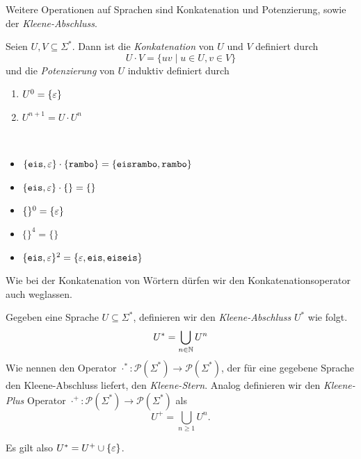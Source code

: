 Weitere Operationen auf Sprachen sind Konkatenation und Potenzierung, sowie der \emph{Kleene-Abschluss}.
\begin{Def} %
	Seien $U,V\subseteq \Sigma^*$. Dann ist die \emph{Konkatenation} von $U$ und $V$ definiert durch
	\[ U\cdot V = \{uv \mid u\in U, v\in V \} \]
  und die \emph{Potenzierung} von $U$ induktiv definiert durch
  \begin{enumerate}
  \item $U^0 = \{\varepsilon\}$
  \item $U^{n+1} = U \cdot U^{n}$
  \qedhere
  \end{enumerate}
\end{Def}
\begin{Bsp*}~
  \begin{itemize}
  \item $\{\mathtt{eis}, \varepsilon\} \cdot \{\mathtt{rambo}\} = \{\mathtt{eisrambo}, \mathtt{rambo}\}$
  \item $\{\mathtt{eis}, \varepsilon\} \cdot \{\} = \{\}$
  \item $\{\}^0 = \{\varepsilon\}$
  \item $\{\}^4 = \{\}$
  \item $\{\mathtt{eis}, \varepsilon\}^2 = \{\varepsilon, \mathtt{eis}, \mathtt{eiseis}\}$
  \qedhere
  \end{itemize}
\end{Bsp*}
Wie bei der Konkatenation von Wörtern dürfen wir den Konkatenationsoperator auch weglassen.
%
\begin{Def}
  Gegeben eine Sprache $U\subseteq\Sigma^*$, definieren wir den \emph{Kleene-Abschluss} $U^*$ wie folgt.
      $$U^* = \bigcup_{n\in\mathbb{N}} U^n$$
  Wie nennen den Operator $\cdot^*:
  \mathcal{P}(\Sigma^*)\rightarrow\mathcal{P}(\Sigma^*)$, der für eine
  gegebene Sprache den Kleene-Abschluss liefert, den
  \emph{Kleene-Stern}. Analog definieren wir den \emph{Kleene-Plus}
  Operator $\cdot^+:
  \mathcal{P}(\Sigma^*)\rightarrow\mathcal{P}(\Sigma^*)$ als  
  $$U^+ = \bigcup_{n\ge1} U^n.$$
\end{Def}
Es gilt also $U^*=U^+\cup\{\varepsilon\}$.

